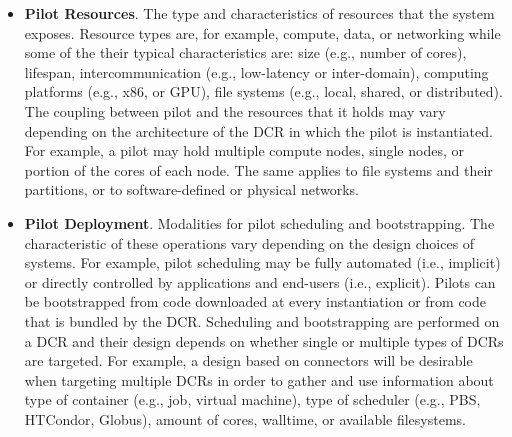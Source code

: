 \documentclass{sig-alternate}
\begin{document}
\begin{itemize}

\item \textbf{Pilot Resources}. The type and characteristics of resources that
  the \pilot system exposes. Resource types are, for example, compute, data, or
  networking while some of the their typical characteristics are: size (e.g.,
  number of cores), lifespan, intercommunication (e.g., low-latency or
  inter-domain), computing platforms (e.g., x86, or GPU), file systems (e.g.,
  local, shared, or distributed). The coupling between pilot and the resources
  that it holds may vary depending on the architecture of the DCR in which the
  pilot is instantiated. For example, a pilot may hold multiple compute nodes,
  single nodes, or portion of the cores of each node. The same applies to file
  systems and their partitions, or to software-defined or physical networks.



\item \textbf{Pilot Deployment}. Modalities for pilot scheduling and
  bootstrapping. The characteristic of these operations vary depending on the
  design choices of \pilot systems. For example, pilot scheduling may be fully
  automated (i.e., implicit) or directly controlled by applications and
  end-users (i.e., explicit). Pilots can be bootstrapped from code downloaded at
  every instantiation or from code that is bundled by the DCR. Scheduling and
  bootstrapping are performed on a DCR and their design depends on whether
  single or multiple types of DCRs are targeted. For example, a design based on
  connectors will be desirable when targeting multiple DCRs in order to gather
  and use information about type of container (e.g., job, virtual machine), type
  of scheduler (e.g., PBS, HTCondor, Globus), amount of cores, walltime, or
  available filesystems.




\end{itemize}
\end{document}
